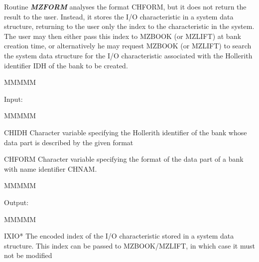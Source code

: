 \par Routine {\bf\it MZFORM} analyses the format CHFORM,
but it does not return the result to the user.
Instead,
it stores the I/O characteristic in a system data structure,
returning to the user only the index to the characteristic
in the system.
The user may then either pass this index to MZBOOK (or MZLIFT)
at bank creation time,
or alternatively he may request MZBOOK (or MZLIFT) to search
the system data structure for the I/O characteristic
associated with the Hollerith identifier IDH of the bank to be
created.
\begin{DL}{MMMMM}
\item[Input:
]
\begin{DL}{MMMMM}
\item[CHIDH
]Character variable specifying the Hollerith identifier of the
bank whose data part is described by the given format
\item[CHFORM
]Character variable specifying the format of the data
part of a bank with name identifier CHNAM.
\end{DL}
\end{DL}
\begin{DL}{MMMMM}
\item[Output:
]
\begin{DL}{MMMMM}
\item[IXIO*
]The encoded index of the I/O characteristic stored in a system
data structure.
This index can be passed to MZBOOK/MZLIFT, in which case it must
not be modified
\end{DL}
\end{DL}
